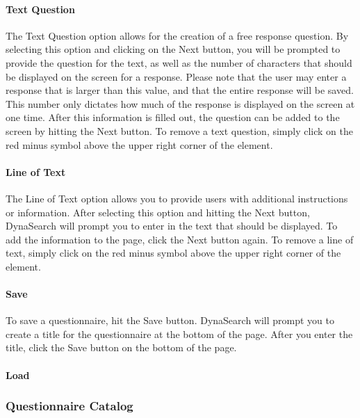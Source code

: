 \documentclass[article]{ij4uq}              %
\begin{document}
\paragraph{Text Question}
The Text Question option allows for the creation of a free response question. By selecting this option and clicking on the Next button, you will be prompted to provide the question for the text, as well as the number of characters that should be displayed on the screen for a response. Please note that the user may enter a response that is larger than this value, and that the entire response will be saved. This number only dictates how much of the response is displayed on the screen at one time. 
After this information is filled out, the question can be added to the screen by hitting the Next button. To remove a text question, simply click on the red minus symbol above the upper right corner of the element.

\paragraph{Line of Text}
The Line of Text option allows you to provide users with additional instructions or information. After selecting this option and hitting the Next button, DynaSearch will prompt you to enter in the text that should be displayed. To add the information to the page, click the Next button again. To remove a line of text, simply click on the red minus symbol above the upper right corner of the element.

\paragraph{Save}
To save a questionnaire, hit the Save button. DynaSearch will prompt you to create a title for the questionnaire at the bottom of the page. After you enter the title, click the Save button on the bottom of the page.

\paragraph{Load}

\subsubsection{Questionnaire Catalog}
\end{document}
